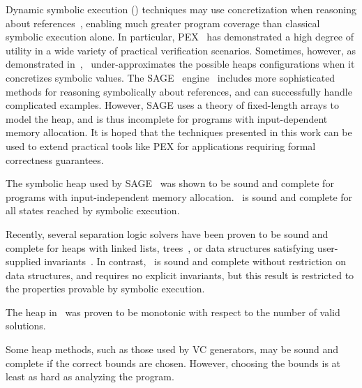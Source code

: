 Dynamic symbolic execution (\dsetxt{}) techniques may use
concretization when reasoning about references~\cite{Godefroid:2005,Sen:2005,Godefroid:POPL07,Tillmann:2008}, enabling much greater program
coverage than classical symbolic execution alone. In particular, PEX~\cite{Tillmann:2008}
has demonstrated a high degree of utility in a wide variety of 
practical verification scenarios. Sometimes,
however, as demonstrated in~\cite{Elkarablieh:2009},~\dsetxt{}
under-approximates the possible heaps configurations when it
concretizes symbolic values. The SAGE~\dsetxt{}
engine~\cite{Elkarablieh:2009} includes more sophisticated methods for
reasoning symbolically about references, and can successfully handle
complicated examples. However, SAGE uses a
theory of fixed-length arrays to model the heap, and is thus incomplete
for programs with input-dependent memory allocation. It is hoped that the 
techniques presented in this work can be used to extend practical tools 
like PEX for applications requiring formal correctness guarantees.

%
The symbolic heap used by SAGE~\cite{Elkarablieh:2009} was shown to be sound and complete for programs with input-independent memory allocation.~\symtxt{} is sound and complete for all states reached by symbolic execution. 

Recently, several separation logic solvers have been proven to be sound and complete for heaps with linked lists, trees~\cite{Piskac:2014}, or data structures satisfying user-supplied invariants~\cite{Brotherston:2014}. In contrast,~\symtxt{} is sound and complete without restriction on data structures, and requires no explicit invariants, but this result is restricted to the properties provable by symbolic execution. 

The heap in~\cite{Dillig:2011} was proven to be monotonic with respect to the number of valid solutions. 

Some heap methods, such as those used by VC generators, may be sound and complete if the correct bounds are chosen. However, choosing the bounds is at least as hard as analyzing the program. 






%
%
%

